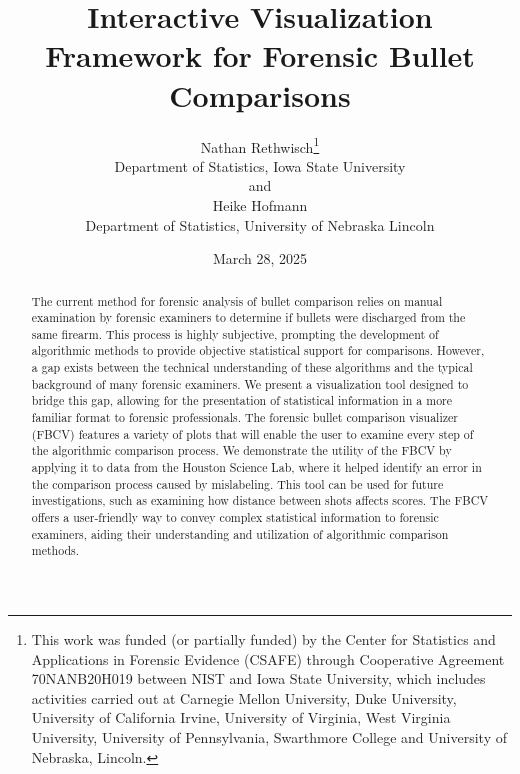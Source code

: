 \documentclass[
  12pt]{article}
\begin{document}
\def\spacingset#1{\renewcommand{\baselinestretch}%
{#1}\small\normalsize} \spacingset{1}



\date{March 28, 2025}
\title{\bf Interactive Visualization Framework for Forensic Bullet
Comparisons}
\author{
Nathan Rethwisch\thanks{This work was funded (or partially funded) by
the Center for Statistics and Applications in Forensic Evidence (CSAFE)
through Cooperative Agreement 70NANB20H019 between NIST and Iowa State
University, which includes activities carried out at Carnegie Mellon
University, Duke University, University of California Irvine, University
of Virginia, West Virginia University, University of Pennsylvania,
Swarthmore College and University of Nebraska, Lincoln.}\\
Department of Statistics, Iowa State University\\
and\\Heike Hofmann\\
Department of Statistics, University of Nebraska Lincoln\\
}
\maketitle

\bigskip
\bigskip
\begin{abstract}
The current method for forensic analysis of bullet comparison relies on
manual examination by forensic examiners to determine if bullets were
discharged from the same firearm. This process is highly subjective,
prompting the development of algorithmic methods to provide objective
statistical support for comparisons. However, a gap exists between the
technical understanding of these algorithms and the typical background
of many forensic examiners. We present a visualization tool designed to
bridge this gap, allowing for the presentation of statistical
information in a more familiar format to forensic professionals. The
forensic bullet comparison visualizer (FBCV) features a variety of plots
that will enable the user to examine every step of the algorithmic
comparison process. We demonstrate the utility of the FBCV by applying
it to data from the Houston Science Lab, where it helped identify an
error in the comparison process caused by mislabeling. This tool can be
used for future investigations, such as examining how distance between
shots affects scores. The FBCV offers a user-friendly way to convey
complex statistical information to forensic examiners, aiding their
understanding and utilization of algorithmic comparison methods.
\end{abstract}
\end{document}

